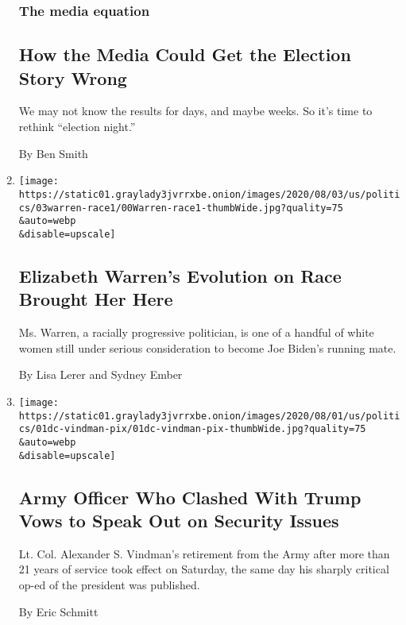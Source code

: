 \begin{enumerate}
  \hypertarget{the-media-equation}{%
  \subsubsection{The media equation}\label{the-media-equation}}

  \hypertarget{how-the-media-could-get-the-election-story-wrong}{%
  \subsection{How the Media Could Get the Election Story
  Wrong}\label{how-the-media-could-get-the-election-story-wrong}}

  We may not know the results for days, and maybe weeks. So it's time to
  rethink ``election night.''

  By Ben Smith
\item
  \href{/2020/08/02/us/politics/elizabeth-warren-biden-vice-president.html}{}

  \texttt{[image: https://static01.graylady3jvrrxbe.onion/images/2020/08/03/us/politics/03warren-race1/00Warren-race1-thumbWide.jpg?quality=75\\\&auto=webp\\\&disable=upscale]}

  \hypertarget{elizabeth-warrens-evolution-on-race-brought-her-here}{%
  \subsection{Elizabeth Warren's Evolution on Race Brought Her
  Here}\label{elizabeth-warrens-evolution-on-race-brought-her-here}}

  Ms. Warren, a racially progressive politician, is one of a handful of
  white women still under serious consideration to become Joe Biden's
  running mate.

  By Lisa Lerer and Sydney Ember
\item
  \href{/2020/08/01/us/politics/alexander-vindman-impeachment-trump.html}{}

  \texttt{[image: https://static01.graylady3jvrrxbe.onion/images/2020/08/01/us/politics/01dc-vindman-pix/01dc-vindman-pix-thumbWide.jpg?quality=75\\\&auto=webp\\\&disable=upscale]}

  \hypertarget{army-officer-who-clashed-with-trump-vows-to-speak-out-on-security-issues}{%
  \subsection{Army Officer Who Clashed With Trump Vows to Speak Out on
  Security
  Issues}\label{army-officer-who-clashed-with-trump-vows-to-speak-out-on-security-issues}}

  Lt. Col. Alexander S. Vindman's retirement from the Army after more
  than 21 years of service took effect on Saturday, the same day his
  sharply critical op-ed of the president was published.

  By Eric Schmitt
\end{enumerate}

